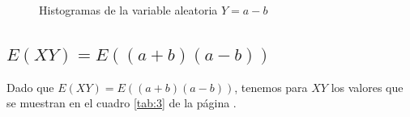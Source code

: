 \documentclass{article}
\begin{document}
\begin{figure}[H]
\centering
{}
\label{fig:a}
\centering
{}
\label{fig:s}
\centering
\caption{Histogramas de la variable aleatoria $Y = a - b$ }
\label{fig:2} 
\end{figure}

\subsection{$E(XY)= E((a+b)(a-b))$}
Dado que $E(XY)= E((a+b)(a-b))$, tenemos para $XY$ los valores que se muestran en el cuadro \ref{tab:3} de la página \pageref{tab:3}. 
\end{document}
